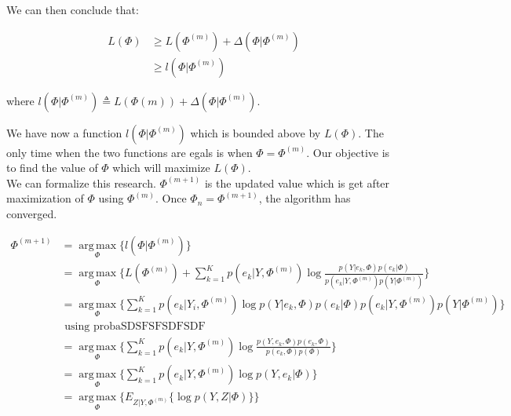 We can then conclude that:

  \begin{align*}
  L(\Phi) &\geq L(\Phi^{(m)}) + \Delta(\Phi|\Phi^{(m)})\\
          &\geq l(\Phi|\Phi^{(m)})
  \end{align*}

where $l(\Phi|\Phi^{(m)}) \triangleq  L(\Phi{(m)}) + \Delta(\Phi|\Phi^{(m)})$.\\
\par
We have now a function $l(\Phi|\Phi^{(m)})$ which is bounded above by $L(\Phi)$. The only time when the two functions are egals is when $\Phi=\Phi^{(m)}$.
Our objective is to find the value of $\Phi$ which will maximize $L(\Phi)$. \\
We can formalize this research. $\Phi^{(m+1)}$ is the updated value which is get after maximization of $\Phi$ using $\Phi^{(m)}$. Once $\Phi_n=\Phi^{(m+1)}$, the algorithm has converged.

  \begin{align}\label{eMF}
  \Phi^{(m+1)} &= \operatorname*{arg\,max}_\Phi \{l(\Phi|\Phi^{(m)})\} \nonumber \\         
             &= \operatorname*{arg\,max}_\Phi \{L(\Phi^{(m)}) + \sum_{k=1}^K   p(e_{k}|Y,\Phi^{(m)})\operatorname*{log} \frac{p(Y|e_{k},\Phi)p(e_{k}|\Phi)}{p(e_{k}|Y,\Phi^{(m)})p(Y|\Phi^{(m)})}\} \nonumber \\
             &=\operatorname*{arg\,max}_\Phi \{\sum_{k=1}^K   p(e_{k}|Y_i,\Phi^{(m)})\operatorname*{log} p(Y|e_{k},\Phi)p(e_{k}|\Phi)p(e_{k}|Y,\Phi^{(m)})p(Y|\Phi^{(m)})\} \nonumber \\
             &\mbox{ using probaSDSFSFSDFSDF } \nonumber \\
             &=\operatorname*{arg\,max}_\Phi \{\sum_{k=1}^K   p(e_{k}|Y,\Phi^{(m)})\operatorname*{log} \frac{p(Y,e_{k},\Phi)p(e_{k},\Phi)}{p(e_{k},\Phi)p(\Phi)}\}      \nonumber \\
             &=\operatorname*{arg\,max}_\Phi \{\sum_{k=1}^K   p(e_{k}|Y,\Phi^{(m)})\operatorname*{log} p(Y,e_{k}|\Phi)\} \\
             &=\operatorname*{arg\,max}_\Phi \{ E_{Z|Y,\Phi^{(m)}} \{\operatorname*{log} p(Y,Z|\Phi)\}\} \nonumber
  \end{align}
  
